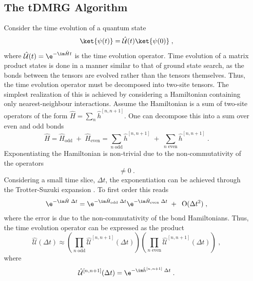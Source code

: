 \subsection{The tDMRG Algorithm}
Consider the time evolution of a quantum state
\begin{equation}
	\ket{\psi (t)} = \hat{\mathcal{U}}(t) \ket{\psi (0)} \; ,
\end{equation}
where $\hat{\mathcal{U}}(t) = \e^{ - \im \hat{H} t }$ is the time evolution operator. 
Time evolution of a matrix product states is done in a manner similar to that of ground state search, as the bonds between the tensors are evolved rather than the tensors themselves. Thus, the time evolution operator must be decomposed into two-site tensors. The simplest realization of this is achieved by considering a Hamiltonian containing only nearest-neighbour interactions.
Assume the Hamiltonian is a sum of two-site operators of the form $\hat{H} = \sum_{n} \hat{h}^{[n , n+1]}$. One can decompose this into a sum over even and odd bonds
\begin{equation}
	\hat{H} = \hat{H}_{\mathrm{odd}} \; + \; \hat{H}_{\mathrm{even}} = \sum_{n \; \mathrm{odd}} \hat{h}^{[n , n+1]} \; + \; \sum_{n \; \mathrm{even}} \hat{h}^{[n , n+1]} \; .
\end{equation}  
Exponentiating the Hamiltonian is non-trivial due to the non-commutativity of the operators
\begin{equation}
	[ \hat{h}_{\mathrm{odd}}^{[n , n+1]} \; , \; \hat{h}_{\mathrm{even}}^{[n , n+1]} ] \neq 0 \; .
\end{equation}
Considering a small time slice, $\Delta t$, the exponentiation can be achieved through the Trotter-Suzuki expansion \cite{Suzuki1991}. To first order this reads
\begin{equation}
	\e^{- \im \hat{H} \; \Delta t} = \e^{- \im \hat{H}_{\mathrm{odd}} \; \Delta t } \e^{- \im \hat{H}_{\mathrm{even}} \; \Delta t} \; + \; \;  \mathrm{O}(\Delta t^2) \; ,
\end{equation}
where the error is due to the non-commutativity of the bond Hamiltonians. Thus, the time evolution operator can be expressed as the product
\begin{equation}
	\hat{\mathcal{U}}(\Delta t) \approx \left( \prod_{n \; \mathrm{odd}} \hat{\mathcal{U}}^{[n,n+1]} (\Delta t) \right) \left( \prod_{n \; \mathrm{even}} \hat{\mathcal{U}}^{[n,n+1]} (\Delta t) \right) \; , \label{eq:SuzukiTrotter1stOrder}
\end{equation}
where
\begin{equation}
	\hat{\mathcal{U}}^{[n,n+1]} (\Delta t) = \e^{- \im \hat{h}^{[n , n+1]} \; \Delta t } \; .
\end{equation}

